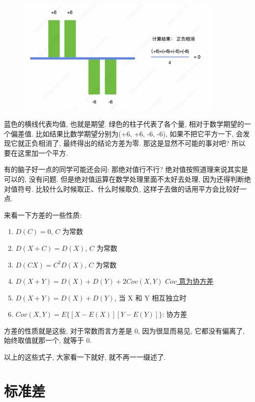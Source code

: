 \begin{figure}[ht]
  \centering
  \includegraphics[width=0.9\textwidth]{asset/713e717f-8a86-42db-83e6-b74c5afe50a4.png}
  \caption{}
  \label{fig:img5_4}
\end{figure}

蓝色的横线代表均值, 也就是期望. 绿色的柱子代表了各个量, 相对于数学期望的一个偏差值. 比如结果比数学期望分别为(+6,  +6,  -6,  -6), 如果不把它平方一下, 会发现它就正负相消了, 最终得出的结论方差为零. 那这是显然不可能的事对吧? 所以要在这里加一个平方. 

有的脑子好一点的同学可能还会问: 那绝对值行不行? 绝对值按照道理来说其实是可以的, 没有问题. 但是绝对值运算在数学处理里面不太好去处理, 因为还得判断绝对值符号. 比较什么时候取正、什么时候取负, 这样子去做的话用平方会比较好一点. 

\hypertarget{方差的性质}{}
来看一下方差的一些性质:

\begin{enumerate}
  \item $D(C)=0$,  $C$ 为常数
  \item $D(X+C) = D(X)$, $C$ 为常数
  \item $D(CX) = C^2D(X)$, $C$ 为常数
  \item $D(X+Y) = D(X) + D(Y) + 2Cov(X,Y)$ \hyperlink{协方差}{$Cov$ 意为协方差}
  \item $D(X+Y) = D(X) +D(Y)$,  当 X 和 Y 相互独立时
  \item $Cov(X, Y) = E\{[X - E(X)][Y-E(Y)]\}$:  协方差
\end{enumerate}

方差的性质就是这些, 对于常数而言方差是 0, 因为很显而易见, 它都没有偏离了, 始终取值就那一个, 就等于 0. 

以上的这些式子, 大家看一下就好, 就不再一一缀述了. 

\section{标准差}

